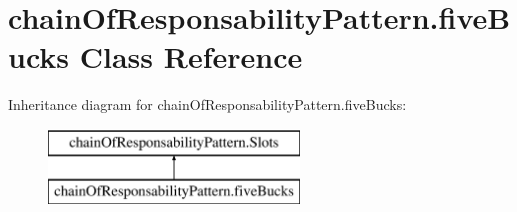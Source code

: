 \hypertarget{classchain_of_responsability_pattern_1_1five_bucks}{}\section{chain\+Of\+Responsability\+Pattern.\+five\+Bucks Class Reference}
\label{classchain_of_responsability_pattern_1_1five_bucks}
Inheritance diagram for chain\+Of\+Responsability\+Pattern.\+five\+Bucks\+:\begin{figure}[H]
\begin{center}
\leavevmode
\includegraphics[height=2.000000cm]{classchain_of_responsability_pattern_1_1five_bucks}
\end{center}
\end{figure}
